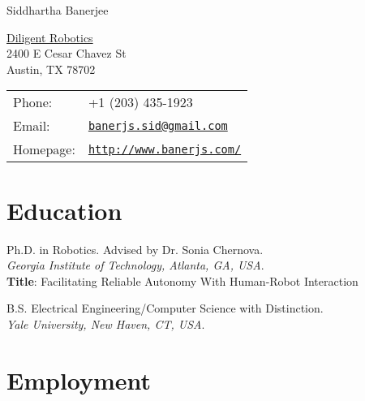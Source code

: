 \documentclass[letterpaper]{article}
\def\name{Siddhartha Banerjee}
\begin{document}
{\huge \name}


\vspace{0.25in}

\begin{minipage}{0.45\linewidth}
  \href{}{Diligent Robotics} \\
  2400 E Cesar Chavez St \\
  Austin, TX 78702
\end{minipage}
\begin{minipage}{0.45\linewidth}
  \begin{tabular}{ll}
    Phone: & +1 (203) 435-1923 \\
    Email: & \href{mailto:banerjs.sid@gmail.com}{\tt banerjs.sid@gmail.com} \\
    Homepage: & \href{http://www.banerjs.com/}{\tt http://www.banerjs.com/} \\
  \end{tabular}
\end{minipage}

\section*{Education}

\begin{description}[leftmargin=7.5em, style=nextline]
  \item[2015 --- 2021] Ph.D. in Robotics. Advised by Dr. Sonia Chernova. \\ \textit{Georgia Institute of Technology, Atlanta, GA, USA}. \\ \textbf{Title}: Facilitating Reliable Autonomy With Human-Robot Interaction

  \item[2009 --- 2013] B.S. Electrical Engineering/Computer Science with Distinction. \\ \textit{Yale University, New Haven, CT, USA}.
\end{description}

\section*{Employment}
\end{document}
